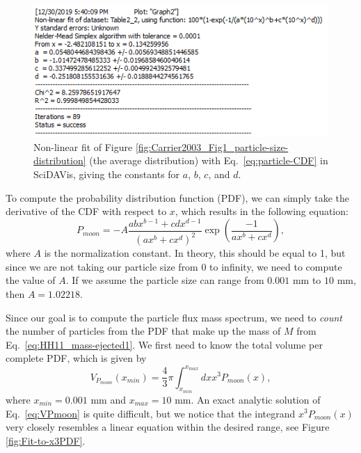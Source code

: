 \documentclass{hitec}
\numberwithin{equation}{section}
\begin{document}
\begin{figure}[h!]
	\centering
	\includegraphics[scale=1]{Fit-to-CDF.PNG}
	\caption{Non-linear fit of Figure \ref{fig:Carrier2003_Fig1_particle-size-distribution} (the average distribution) with Eq.\ \ref{eq:particle-CDF} in \textsf{SciDAVis}, giving the constants for $a$, $b$, $c$, and $d$.}\label{fig:Fit-to-CDF}
\end{figure}

To compute the probability distribution function (PDF), we can simply take the derivative of the CDF with respect to $x$, which results in the following equation:
\begin{equation}
P_{moon} = -A\frac{abx^{b-1}+cdx^{d-1}}{(ax^b+cx^d)^2}\exp\left(\frac{-1}{ax^b+cx^d}\right),
\end{equation}
where $A$ is the normalization constant. In theory, this should be equal to 1, but since we are not taking our particle size from 0 to infinity, we need to compute the value of $A$. If we assume the particle size can range from $0.001$ mm to $10$ mm, then $A = 1.02218$.

Since our goal is to compute the particle flux mass spectrum, we need to \textit{count} the number of particles from the PDF that make up the mass of $M$ from Eq.\ \ref{eq:HH11_mass-ejected1}. We first need to know the total volume per complete PDF, which is given by
\begin{equation}\label{eq:VPmoon}
V_{P_{moon}}(x_{min}) = \frac{4}{3}\pi \int_{x_{min}}^{x_{max}}dx x^3 P_{moon}(x),
\end{equation}
where $x_{min} = 0.001$ mm and $x_{max} = 10$ mm. An exact analytic solution of Eq.\ \ref{eq:VPmoon} is quite difficult, but we notice that the integrand $x^3 P_{moon}(x)$ very closely resembles a linear equation within the desired range, see Figure \ref{fig:Fit-to-x3PDF}.
\end{document}
